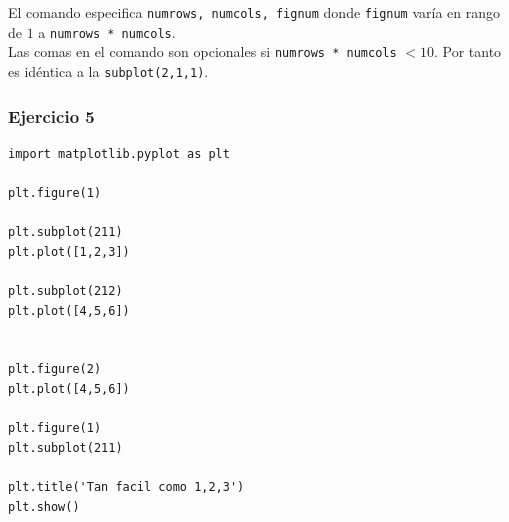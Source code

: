 \begin{frame}
El comando  especifica \texttt{numrows, numcols, fignum} donde \texttt{fignum} varía en rango de $1$ a \texttt{numrows * numcols}.
\\
\bigskip
Las comas en el comando  son opcionales si \texttt{numrows * numcols} $<10$. Por tanto  es idéntica a la \texttt{subplot(2,1,1)}.
\end{frame}
\begin{frame}
\frametitle{Ejercicio 5}
\begin{lstlisting}[caption=Ejemplo con subplots, basicstyle=\linespread{1.2}\ttfamily\small, columns=fullflexible]
import matplotlib.pyplot as plt

plt.figure(1)                

plt.subplot(211)        
plt.plot([1,2,3])

plt.subplot(212)         
plt.plot([4,5,6])


plt.figure(2)                
plt.plot([4,5,6])           

plt.figure(1)                
plt.subplot(211)         

plt.title('Tan facil como 1,2,3')
plt.show()
\end{lstlisting}
\end{frame}
